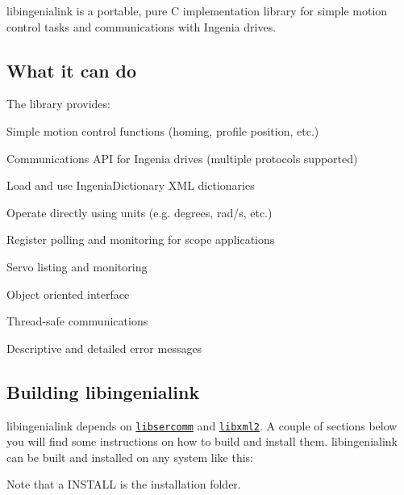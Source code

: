 \href{https://travis-ci.org/ingeniamc/ingenialink}{\tt } \href{https://ci.appveyor.com/project/gmarull/ingenialink}{\tt }

{\ttfamily libingenialink} is a portable, pure C implementation library for simple motion control tasks and communications with Ingenia drives.

\href{http://www.ingeniamc.com}{\tt }

\subsection*{What it can do}

The library provides\+:


\begin{DoxyItemize}
\item Simple motion control functions (homing, profile position, etc.)
\item Communications A\+PI for Ingenia drives (multiple protocols supported)
\item Load and use Ingenia\+Dictionary X\+ML dictionaries
\item Operate directly using units (e.\+g. degrees, rad/s, etc.)
\item Register polling and monitoring for scope applications
\item Servo listing and monitoring
\item Object oriented interface
\item Thread-\/safe communications
\item Descriptive and detailed error messages
\end{DoxyItemize}

\subsection*{Building libingenialink}

{\ttfamily libingenialink} depends on \href{https://github.com/ingeniamc/sercomm}{\tt libsercomm} and \href{https://xmlsoft.org}{\tt libxml2}. A couple of sections below you will find some instructions on how to build and install them. {\ttfamily libingenialink} can be built and installed on any system like this\+:




Note that a {\ttfamily I\+N\+S\+T\+A\+LL} is the installation folder.

